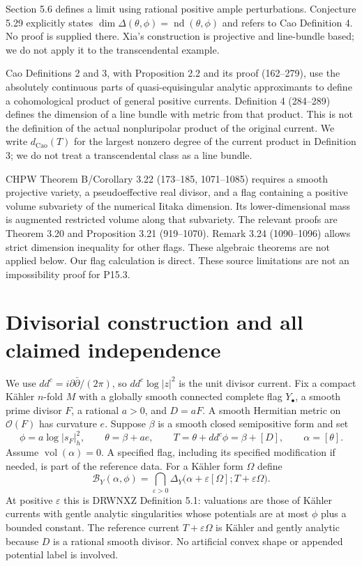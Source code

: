 \documentclass[11pt]{article}
\newcommand{\ddc}{dd^c}
\newcommand{\Ca}{\mathrm{Cao}}
\newcommand{\vol}{\operatorname{vol}}
\newcommand{\B}{\mathcal B}
\begin{document}
Section 5.6 defines a limit using rational positive ample perturbations. Conjecture 5.29 explicitly states $\dim\Delta(\theta,\phi)=\operatorname{nd}(\theta,\phi)$ and refers to Cao Definition 4. No proof is supplied there. Xia's construction is projective and line-bundle based; we do not apply it to the transcendental example.

Cao Definitions 2 and 3, with Proposition 2.2 and its proof (162--279), use the absolutely continuous parts of quasi-equisingular analytic approximants to define a cohomological product of general positive currents. Definition 4 (284--289) defines the dimension of a line bundle with metric from that product. This is not the definition of the actual nonpluripolar product of the original current. We write $d_{\Ca}(T)$ for the largest nonzero degree of the current product in Definition 3; we do not treat a transcendental class as a line bundle.

CHPW Theorem B/Corollary 3.22 (173--185, 1071--1085) requires a smooth projective variety, a pseudoeffective real divisor, and a flag containing a positive volume subvariety of the numerical Iitaka dimension. Its lower-dimensional mass is augmented restricted volume along that subvariety. The relevant proofs are Theorem 3.20 and Proposition 3.21 (919--1070). Remark 3.24 (1090--1096) allows strict dimension inequality for other flags. These algebraic theorems are not applied below. Our flag calculation is direct. These source limitations are not an impossibility proof for P15.3.

\section{Divisorial construction and all claimed independence}
We use $\ddc=i\partial\bar\partial/(2\pi)$, so $\ddc\log|z|^2$ is the unit divisor current. Fix a compact K\"ahler $n$-fold $M$ with a globally smooth connected complete flag $Y_\bullet$, a smooth prime divisor $F$, a rational $a>0$, and $D=aF$. A smooth Hermitian metric on $\mathcal O(F)$ has curvature $e$. Suppose $\beta$ is a smooth closed semipositive form and set
\[
 \phi=a\log|s_F|_h^2,\qquad \theta=\beta+ae,\qquad
 T=\theta+\ddc\phi=\beta+[D],\qquad \alpha=[\theta].
\]
Assume $\vol(\alpha)=0$. A specified flag, including its specified modification if needed, is part of the reference data. For a K\"ahler form $\Omega$ define
\[
 \B_Y(\alpha,\phi)=\bigcap_{\varepsilon>0}
 \Delta_Y\bigl(\alpha+\varepsilon[\Omega];T+\varepsilon\Omega\bigr).
 \tag{2.1}
\]
At positive $\varepsilon$ this is DRWNXZ Definition 5.1: valuations are those of K\"ahler currents with gentle analytic singularities whose potentials are at most $\phi$ plus a bounded constant. The reference current $T+\varepsilon\Omega$ is K\"ahler and gently analytic because $D$ is a rational smooth divisor. No artificial convex shape or appended potential label is involved.
\end{document}
